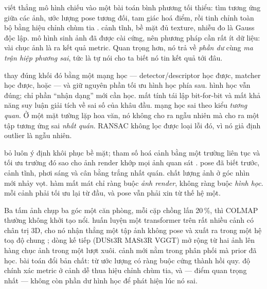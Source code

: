 \documentclass[../../../deep_learning.tex]{subfiles}
\begin{document}
\begin{mach}
\item {} \gp viết thẳng mô hình chiếu vào một bài toán bình phương tối thiểu: tìm tương ứng giữa các ảnh, ước lượng pose tương đối, tam giác hoá điểm, rồi tinh chỉnh toàn bộ bằng hiệu chỉnh chùm tia \cite{hartley2004,schoenberger2016colmap}. \gd cảnh tĩnh, bề mặt  đủ texture, nhiễu đo là Gauss độc lập. \hq mô hình sinh ảnh đã được cài cứng, nên phương pháp cần rất ít dữ liệu: vài chục ảnh là ra kết quả metric. Quan trọng hơn, nó trả về \emph{phần dư} cùng \emph{ma trận hiệp phương sai}, tức là tự nói cho ta biết nó tin kết quả tới đâu.
\item {} \gp thay đúng khối đó bằng một mạng học --- detector/descriptor học được, matcher học được, hoặc  --- và giữ nguyên phần tối ưu hình học phía sau. \gd hình học vẫn đúng; chỉ phần ``nhận dạng'' mới cần học. \gia mất tính tái lập bit-for-bit và mất khả năng suy luận giải tích về sai số của khâu đầu. \vdm mạng học sai theo kiểu \emph{tương quan}. Ở một mặt tường lặp hoa văn, nó không cho ra  ngẫu nhiên mà cho ra một tập tương ứng sai \emph{nhất quán}. RANSAC không lọc được loại lỗi đó, vì nó giả định outlier là ngẫu nhiên.
\item {} \gp bỏ luôn ý định khôi phục bề mặt; tham số hoá cảnh bằng một trường liên tục và tối ưu trường đó sao cho ảnh render khớp mọi ảnh quan sát \cite{mildenhall2020nerf}. \gd pose đã biết trước, cảnh tĩnh, phơi sáng và cân bằng trắng nhất quán. \hq chất lượng ảnh ở góc nhìn mới nhảy vọt. \gia hàm mất mát chỉ ràng buộc \emph{ảnh render}, không ràng buộc \emph{hình học}. \vdm mỗi cảnh phải tối ưu lại từ đầu, và pose vẫn phải xin từ thế hệ một.
\item {} Ba tấm ảnh chụp ba góc một căn phòng, mỗi cặp chồng lấn 20\,\%, thì COLMAP thường không khởi tạo nổi. \gp huấn luyện một transformer trên rất nhiều cảnh có chân trị 3D, cho nó nhận thẳng một tập ảnh không pose và xuất ra  trong một hệ toạ độ chung \cite{wang2024dust3r}; dòng kế tiếp (DUSt3R \ra MASt3R \ra VGGT) mở rộng từ hai ảnh lên hàng chục ảnh trong một lượt xuôi. \gd cảnh mới nằm trong phân phối mà prior đã học. \hq bài toán đổi bản chất: từ ước lượng có ràng buộc cứng thành hồi quy. \gia độ chính xác metric ở cảnh dễ thua hiệu chỉnh chùm tia, và --- điểm quan trọng nhất --- không còn phần dư hình học để phát hiện lúc nó sai.
\end{mach}
\end{document}
